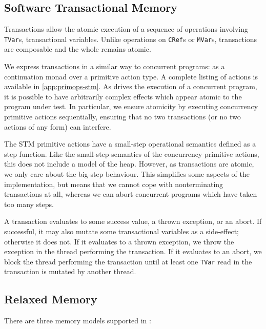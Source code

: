 \subsection{Software Transactional Memory}

Transactions allow the atomic execution of a sequence of operations involving
\verb|TVar|s, transactional variables.  Unlike operations on \verb|CRef|s or
\verb|MVar|s, transactions are composable and the whole remains atomic.

We express transactions in a similar way to concurrent programs: as a
continuation monad over a primitive action type.  A complete listing of actions
is available in \cref{app:primops-stm}.  As \dejafu{} drives the execution of a
concurrent program, it is possible to have arbitrarily complex effects which
appear atomic to the program under test.  In particular, we ensure atomicity by
executing concurrency primitive actions sequentially, ensuring that no two
transactions (or no two actions of any form) can interfere.

The STM primitive actions have a small-step operational semantics defined as a
step function.  Like the small-step semantics of the concurrency primitive
actions, this does not include a model of the heap.  However, as transactions
are atomic, we only care about the big-step behaviour.  This simplifies some
aspects of the implementation, but means that we cannot cope with nonterminating
transactions at all, whereas we can abort concurrent programs which have taken
too many steps.

A transaction evaluates to some success value, a thrown exception, or an abort.
If successful, it may also mutate some transactional variables as a side-effect;
otherwise it does not.  If it evaluates to a thrown exception, we throw the
exception in the thread performing the transaction.  If it evaluates to an
abort, we block the thread performing the transaction until at least one
\verb|TVar| read in the transaction is mutated by another thread.

\subsection{Relaxed Memory}

There are three memory models supported in \dejafu{}:

